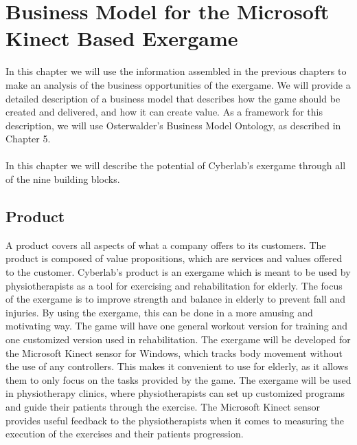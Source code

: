 \chapter{Business Model for the Microsoft Kinect Based Exergame}
In this chapter we will use the information assembled in the previous chapters to  make an analysis of the business opportunities of the exergame. We will provide a detailed description of a business model that describes how the game should be created and delivered, and how it can create value. As a framework for this description, we will use Osterwalder's Business Model Ontology, as described in Chapter 5. \\ \\ 
In this chapter we will describe the potential of Cyberlab's exergame through all of the nine building blocks.  

\section{Product}
A product covers all aspects of what a company offers to its customers. The product is composed of value propositions, which are services and values offered to the customer. Cyberlab’s product is an exergame which is meant to be used by physiotherapists as a tool for exercising and rehabilitation for elderly. The focus of the exergame is to improve strength and balance in elderly to prevent fall and injuries. By using the exergame, this can be done in a more amusing and motivating way. The game will have one general workout version for training and one customized version used in rehabilitation. The exergame will be developed for the Microsoft Kinect sensor for Windows, which tracks body movement without the use of any controllers. This makes it convenient to use for elderly, as it allows them to only focus on the tasks provided by the game. The exergame will be used in physiotherapy clinics, where physiotherapists can set up customized programs and guide their patients through the exercise. The Microsoft Kinect sensor provides useful feedback to the physiotherapists when it comes to measuring the execution of the exercises and their patients progression. 
